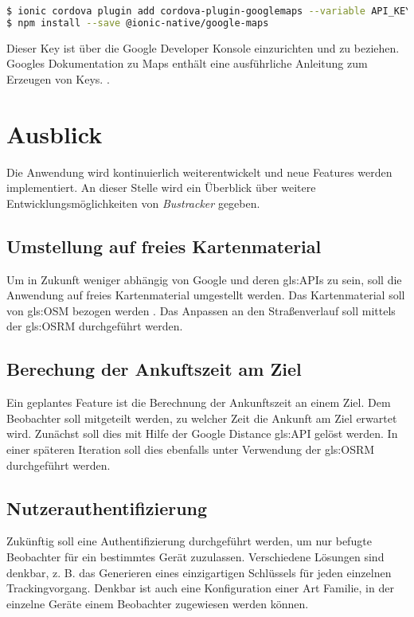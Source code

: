 \begin{lstlisting}[float,language= Bash, caption= CLI Befehle - Installation Google Maps Plugin , label=lst:mapsPlugin]
$ ionic cordova plugin add cordova-plugin-googlemaps --variable API_KEY_FOR_ANDROID="YOUR_ANDROID_API_KEY_IS_HERE" --variable API_KEY_FOR_IOS="YOUR_IOS_API_KEY_IS_HERE"
$ npm install --save @ionic-native/google-maps
\end{lstlisting}

Dieser Key ist über die Google Developer Konsole \cite{GoogleDevConsole} einzurichten und zu beziehen. Googles  Dokumentation zu Maps enthält eine ausführliche Anleitung zum Erzeugen von Keys. \cite{GoogleGetKey}.


\section{Ausblick}
\label{sec:Ausblick}
Die Anwendung wird kontinuierlich weiterentwickelt und neue Features werden implementiert. An dieser Stelle wird ein Überblick über weitere Entwicklungsmöglichkeiten von \emph{Bustracker} gegeben.

\subsection[Freies Kartenmaterial]{Umstellung auf freies Kartenmaterial}
Um in Zukunft weniger abhängig von Google und deren \glspl{gls:API} zu sein, soll die Anwendung auf freies Kartenmaterial umgestellt werden. Das Kartenmaterial soll von \gls{gls:OSM} bezogen werden \cite{OSM}. Das Anpassen an den Straßenverlauf soll mittels der \gls{gls:OSRM} \cite{OSRM} durchgeführt werden. 

\subsection[Ankunftszeitberechnung]{Berechung der Ankuftszeit am Ziel}
Ein geplantes Feature ist die Berechnung der Ankunftszeit an einem Ziel. Dem Beobachter soll mitgeteilt werden, zu welcher Zeit die Ankunft am Ziel erwartet wird. Zunächst soll dies mit Hilfe der Google Distance \gls{gls:API} gelöst werden. In einer späteren Iteration soll dies ebenfalls unter Verwendung der \gls{gls:OSRM} durchgeführt werden. 

\subsection{Nutzerauthentifizierung}
Zukünftig soll eine Authentifizierung durchgeführt werden, um nur befugte Beobachter für ein bestimmtes Gerät zuzulassen.
Verschiedene Lösungen sind denkbar, z. B. das Generieren eines einzigartigen Schlüssels für jeden einzelnen Trackingvorgang. 
Denkbar ist auch eine Konfiguration einer Art Familie, in der einzelne Geräte einem Beobachter zugewiesen werden können.

